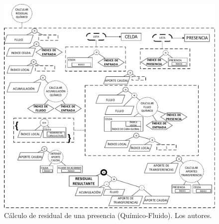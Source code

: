 \begin{figure}[h]
	\centering%
	\includegraphics[width=0.9\linewidth]{Fig/CalcularResidualQuimico.pdf}%
	\caption[Cálculo de residual de una presencia.]{Cálculo de residual de una presencia (Químico-Fluido). Los autores.} \label{fig:ResidualChemical}
\end{figure}

